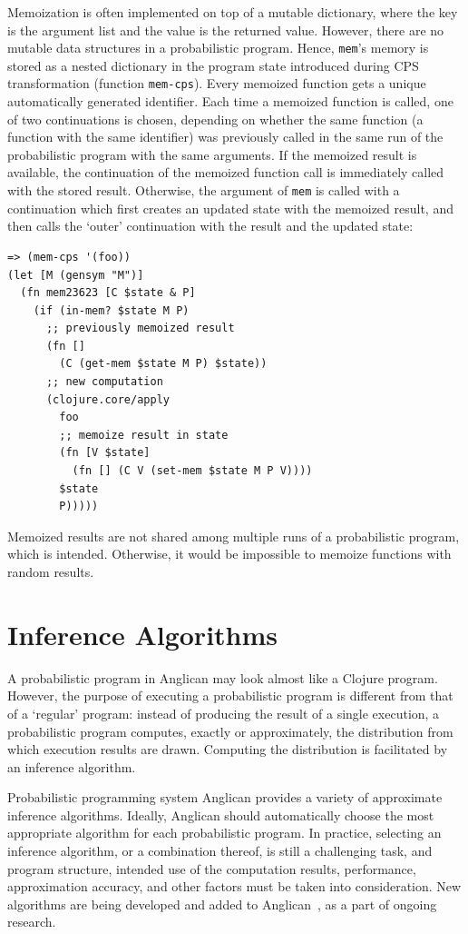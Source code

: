 \documentclass[preprint]{sigplanconf}
\begin{document}
Memoization is often implemented on top of a mutable
dictionary, where the key is the argument list and the value is
the returned value. However, there are no mutable data
structures in a probabilistic program. Hence, \texttt{mem}'s
memory is stored as a nested dictionary in the program state
introduced during CPS transformation (function \texttt{mem-cps}).  
Every memoized function gets a
unique automatically generated identifier. Each time a memoized
function is called, one of two continuations is chosen,
depending on whether the same function (a function with the same
identifier) was previously called in the same run of the
probabilistic program with the same arguments. If the memoized
result is available, the continuation of the memoized function
call is immediately called with the stored result. Otherwise,
the argument of \texttt{mem} is called with a continuation which
first creates an updated state with the memoized result, and
then calls the `outer' continuation with the result and the
updated state:
\begin{lstlisting}[style=default]
=> (mem-cps '(foo))
(let [M (gensym "M")]
  (fn mem23623 [C $state & P]
    (if (in-mem? $state M P)
      ;; previously memoized result
      (fn []
        (C (get-mem $state M P) $state))
      ;; new computation
      (clojure.core/apply
        foo
        ;; memoize result in state
        (fn [V $state]
          (fn [] (C V (set-mem $state M P V))))
        $state
        P)))))
\end{lstlisting}

Memoized results are not shared among multiple runs of a
probabilistic program, which is intended. Otherwise, it would be
impossible to memoize functions with random results.

\section{Inference Algorithms}
\label{sec:inference}

A probabilistic program in Anglican may look almost like a
Clojure program. However, the purpose of executing a
probabilistic program is different from that of a `regular'
program: instead of producing the result of a single execution,
a probabilistic program computes, exactly or approximately, the
distribution from which execution results are drawn.  Computing
the distribution is facilitated by an inference algorithm.

Probabilistic programming system Anglican provides a variety of
approximate inference algorithms. Ideally, Anglican should
automatically choose the most appropriate algorithm for each
probabilistic program. In practice, selecting an inference
algorithm, or a combination thereof, is still a challenging
task, and program structure, intended use of the computation
results, performance, approximation accuracy, and other factors
must be taken into consideration. New algorithms are being
developed and added to Anglican~\cite{TMP+15,MPT+16,RNL+2016},
as a part of ongoing research.
\end{document}
